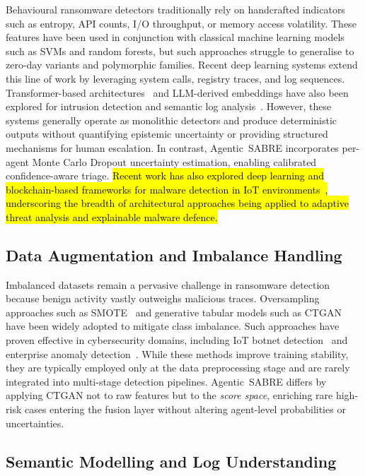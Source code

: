 \documentclass[3p]{elsarticle}
\begin{document}
Behavioural ransomware detectors traditionally rely on handcrafted indicators such as entropy, API counts, I/O throughput, or memory access volatility. These features have been used in conjunction with classical machine learning models such as SVMs and random forests, but such approaches struggle to generalise to zero-day variants and polymorphic families. Recent deep learning systems extend this line of work by leveraging system calls, registry traces, and log sequences. Transformer-based architectures~\cite{vaswani2017attention} and LLM-derived embeddings have also been explored for intrusion detection and semantic log analysis~\cite{tian2025llmsurvey, BenchmarkingLLMsPhishing2024,
CANAL_CTILLM2024}. However, these systems generally operate as monolithic
detectors and produce deterministic outputs without quantifying epistemic
uncertainty or providing structured mechanisms for human escalation. In contrast, Agentic~SABRE incorporates per-agent Monte Carlo Dropout uncertainty estimation, enabling calibrated confidence-aware triage. \hl{Recent work has also explored deep learning and blockchain-based frameworks for malware detection in IoT environments~\cite{pawar2024securing}, underscoring the breadth of architectural approaches being applied to adaptive threat analysis and explainable malware defence.}

\subsection{Data Augmentation and Imbalance Handling}

Imbalanced datasets remain a pervasive challenge in ransomware detection because benign activity vastly outweighs malicious traces. Oversampling approaches such as SMOTE~\cite{chawla2002smote} and generative tabular models such as CTGAN ~\cite{xu2019ctgan, ashrapov2020tabular} have been widely adopted to mitigate class imbalance. Such approaches have proven effective in cybersecurity domains, including IoT botnet detection~\cite{HabibiCL23} and enterprise anomaly detection~\cite{AIenhancedDefense2022}. While these methods improve training
stability, they are typically employed only at the data preprocessing stage and are rarely integrated into multi-stage detection pipelines. Agentic~SABRE differs by applying CTGAN not to raw features but to the \emph{score space}, enriching rare high-risk cases entering the fusion layer without altering agent-level probabilities or uncertainties.

\subsection{Semantic Modelling and Log Understanding}
\end{document}

